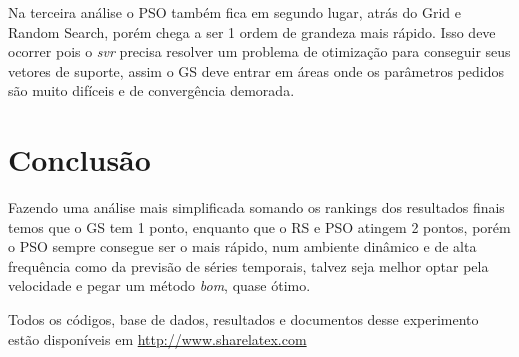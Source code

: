 \documentclass[preprint,12pt]{elsarticle}
\begin{document}
Na terceira análise o PSO também fica em segundo lugar, atrás do Grid e Random Search, porém chega a ser 1 ordem de grandeza mais rápido. Isso deve ocorrer pois o \textit{svr} precisa resolver um problema de otimização para conseguir seus vetores de suporte, assim o GS deve entrar em áreas onde os parâmetros pedidos são muito difíceis e de convergência demorada.


\section{Conclusão}

Fazendo uma análise mais simplificada somando os rankings dos resultados finais temos que o GS tem 1 ponto, enquanto que o RS e PSO atingem 2 pontos, porém o PSO sempre consegue ser o mais rápido, num ambiente dinâmico e de alta frequência como da previsão de séries temporais, talvez seja melhor optar pela velocidade e pegar um método \textit{bom}, quase ótimo.

Todos os códigos, base de dados, resultados e documentos desse experimento estão disponíveis em \url{http://www.sharelatex.com}




\end{document}
